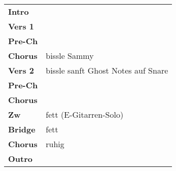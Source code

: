 
\begin{tabular}{p{1.6cm}l}
	\textbf{Intro}  &                                    \\
	\textbf{Vers 1} &                                    \\
	\textbf{Pre-Ch} &                                    \\
	\textbf{Chorus} & bissle Sammy                       \\
	\textbf{Vers 2} & bissle sanft Ghost Notes auf Snare \\
	\textbf{Pre-Ch} &                                    \\
	\textbf{Chorus} &                                    \\
	\textbf{Zw}     & fett (E-Gitarren-Solo)             \\
	\textbf{Bridge} & fett                               \\
	\textbf{Chorus} & ruhig                              \\
	\textbf{Outro}  &                                    \\
\end{tabular}
